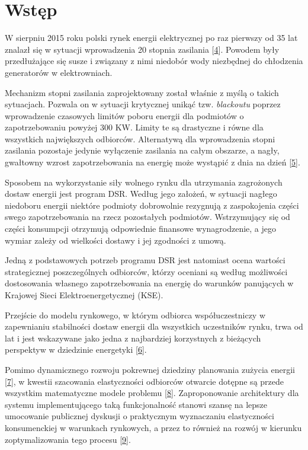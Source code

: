 \hypertarget{wstux119p}{%
\chapter{Wstęp}\label{wstux119p}}

W sierpniu 2015 roku polski rynek energii elektrycznej po raz pierwszy
od 35 lat znalazł się w sytuacji wprowadzenia 20 stopnia zasilania
{[}\protect\hyperlink{ref-dolega_national_2018}{4}{]}. Powodem były
przedłużające się susze i związany z nimi niedobór wody niezbędnej do
chłodzenia generatorów w elektrowniach.

Mechanizm stopni zasilania zaprojektowany został właśnie z myślą o
takich sytuacjach. Pozwala on w sytuacji krytycznej unikąć tzw.
\emph{blackoutu} poprzez wprowadzenie czasowych limitów poboru energii
dla podmiotów o zapotrzebowaniu powyżej 300 KW. Limity te są drastyczne
i równe dla wszystkich największych odbiorców. Alternatywą dla
wprowadzenia stopni zasilania pozostaje jedynie wyłączenie zasilania na
całym obszarze, a nagły, gwałtowny wzrost zapotrzebowania na energię
może wystąpić z dnia na dzień
{[}\protect\hyperlink{ref-pap_pse_2015}{5}{]}.

Sposobem na wykorzystanie siły wolnego rynku dla utrzymania zagrożonych
dostaw energii jest program DSR. Według jego założeń, w sytuacji nagłego
niedoboru energii niektóre podmioty dobrowolnie rezygnują z zaspokojenia
części swego zapotrzebowania na rzecz pozostałych podmiotów.
Wstrzymujący się od części konsumpcji otrzymują odpowiednie finansowe
wynagrodzenie, a jego wymiar zależy od wielkości dostawy i jej zgodności
z umową.

Jedną z podstawowych potrzeb programu DSR jest natomiast ocena wartości
strategicznej poszczególnych odbiorców, którzy oceniani są według
możliwości dostosowania własnego zapotrzebowania na energię do warunków
panujących w Krajowej Sieci Elektroenergetycznej (KSE).

Przejście do modelu rynkowego, w którym odbiorca współuczestniczy w
zapewnianiu stabilności dostaw energii dla wszystkich uczestników rynku,
trwa od lat i jest wskazywane jako jedna z najbardziej korzystnych z
bieżących perspektyw w dziedzinie energetyki
{[}\protect\hyperlink{ref-ramchurn_putting_2012}{6}{]}.

Pomimo dynamicznego rozwoju pokrewnej dziedziny planowania zużycia
energii {[}\protect\hyperlink{ref-curtis_demand_2018}{7}{]}, w kwestii
szacowania elastyczności odbiorców otwarcie dotępne są przede wszystkim
matematyczne modele problemu
{[}\protect\hyperlink{ref-lund_review_2015}{8}{]}. Zaproponowanie
architektury dla systemu implementującego taką funkcjonalność stanowi
szansę na lepsze umocowanie publicznej dyskusji o praktycznym
wyznaczaniu elastyczności konsumenckiej w warunkach rynkowych, a przez
to również na rozwój w kierunku zoptymalizowania tego procesu
{[}\protect\hyperlink{ref-kulkarni_perfect_2016}{9}{]}.

